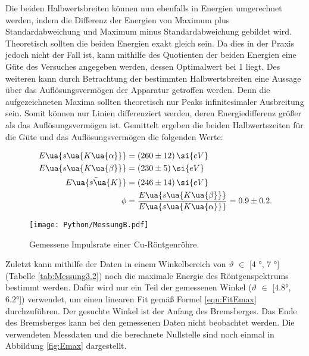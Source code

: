 Die beiden Halbwertsbreiten können nun ebenfalls in Energien umgerechnet werden,
indem die Differenz der Energien von Maximum plus Standardabweichung und Maximum
minus Standardabweichung gebildet wird.
Theoretisch sollten die beiden Energien exakt gleich sein. Da dies in der
Praxis jedoch nicht der Fall ist, kann mithilfe des Quotienten der beiden Energien
eine Güte des Versuches angegeben werden, dessen Optimalwert bei 1 liegt.
Des weiteren
kann durch Betrachtung der bestimmten Halbwertsbreiten eine Aussage über das
Auflösungsvermögen der Apparatur getroffen werden. Denn die aufgezeichneten
Maxima sollten theoretisch nur Peaks infinitesimaler Ausbreitung sein. Somit können
nur Linien differenziert werden, deren Energiedifferenz größer als das
Auflösungsvermögen ist. Gemittelt
ergeben die beiden Halbwertszeiten für die Güte und das Auflösungsvermögen
die folgenden Werte:

\begin{align*}
  E\ua{s\ua{K\ua{\alpha}}} &= (260 \pm 12)  \, \si{eV} \\
  E\ua{s\ua{K\ua{\beta}}} &= (230 \pm 5) \, \si{eV} \\
  \bar{E\ua{s\ua{K}}} &= (246 \pm 14) \, \si{eV} \\
  \phi &= \frac{E\ua{s\ua{K\ua{\beta}}}}{E\ua{s\ua{K\ua{\alpha}}}} = 0.9 \pm 0.2 .
\end{align*}

\begin{figure}
  \centering
  \texttt{[image: Python/MessungB.pdf]}
  \caption{Gemessene Impulsrate einer Cu-Röntgenröhre.}
  \label{fig:MessungB}
\end{figure}





\newpage %

Zuletzt kann mithilfe der Daten in einem Winkelbereich von $\vartheta$ $\in$
[4 °, 7 °] (Tabelle \ref{tab:Messung3.2}) noch die maximale Energie des
Röntgenspektrums bestimmt werden. Dafür wird nur ein Teil der gemessenen
Winkel ($\vartheta$ $\in$ [$\ang{4.8}$, $\ang{6.2}$]) verwendet,
um einen linearen Fit gemäß Formel \eqref{eqn:FitEmax} durchzuführen. Der
gesuchte Winkel ist der Anfang des Bremsberges. Das Ende des Bremsberges
kann bei den gemessenen Daten nicht beobachtet werden. Die verwendeten Messdaten
und die berechnete Nullstelle sind noch einmal in Abbildung \ref{fig:Emax}
dargestellt.

